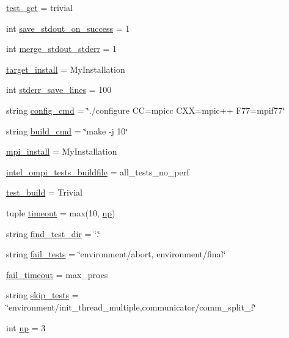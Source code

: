 \begin{DoxyCompactItemize}
\item 
\hyperlink{namespacehwtest_a10d7a3bc8e20a9b333fb253328ca7e8c}{test\-\_\-get} = trivial
\item 
int \hyperlink{namespacehwtest_afffd8e55c08b72fb88423c7446b90d70}{save\-\_\-stdout\-\_\-on\-\_\-success} = 1
\item 
int \hyperlink{namespacehwtest_a48f78a49ff7c6103a9c7c8565ec98438}{merge\-\_\-stdout\-\_\-stderr} = 1
\item 
\hyperlink{namespacehwtest_ae44fdc8b804d0261bc648dc81fccf671}{target\-\_\-install} = My\-Installation
\item 
int \hyperlink{namespacehwtest_aa6450e0e7dfc9a867ed2a7a81477aba2}{stderr\-\_\-save\-\_\-lines} = 100
\item 
string \hyperlink{namespacehwtest_aae03e4589fc182736e73d50bbb74346e}{config\-\_\-cmd} = \char`\"{}./configure C\-C=mpicc C\-X\-X=mpic++ F77=mpif77\char`\"{}
\item 
string \hyperlink{namespacehwtest_a5378e5bba23994a3a52c3381e619b18b}{build\-\_\-cmd} = \char`\"{}make -\/j 10\char`\"{}
\item 
\hyperlink{namespacehwtest_a92b45acc8d45d80d6032cba2a6b6dd5e}{mpi\-\_\-install} = My\-Installation
\item 
\hyperlink{namespacehwtest_a6047a9d712208748ac55f9c3e2bcc0ce}{intel\-\_\-ompi\-\_\-tests\-\_\-buildfile} = all\-\_\-tests\-\_\-no\-\_\-perf
\item 
\hyperlink{namespacehwtest_a5ba5b6a44052b71d5033b0673947ced0}{test\-\_\-build} = Trivial
\item 
tuple \hyperlink{namespacehwtest_a71b9053f13108a7a4c06692c840d6308}{timeout} = max(10, \hyperlink{namespacehwtest_a91f9231befdd013bc572920c4f6320ff}{np})
\item 
string \hyperlink{namespacehwtest_af3c2c504aec4d3d87f8382d577e362ca}{find\-\_\-test\-\_\-dir} = \char`\"{}.\char`\"{}
\item 
string \hyperlink{namespacehwtest_ad08296b7abe004e90b638ec9eb5c0c30}{fail\-\_\-tests} = \char`\"{}environment/abort, environment/final\char`\"{}
\item 
\hyperlink{namespacehwtest_a30cc5b5edc143ffd8006c27213d903f9}{fail\-\_\-timeout} = max\-\_\-procs
\item 
string \hyperlink{namespacehwtest_ae1b5040a9a3c1b72300a18fc85116bc4}{skip\-\_\-tests} = \char`\"{}environment/init\-\_\-thread\-\_\-multiple,communicator/comm\-\_\-split\-\_\-f\char`\"{}
\item 
int \hyperlink{namespacehwtest_a91f9231befdd013bc572920c4f6320ff}{np} = 3

\end{DoxyCompactItemize}
